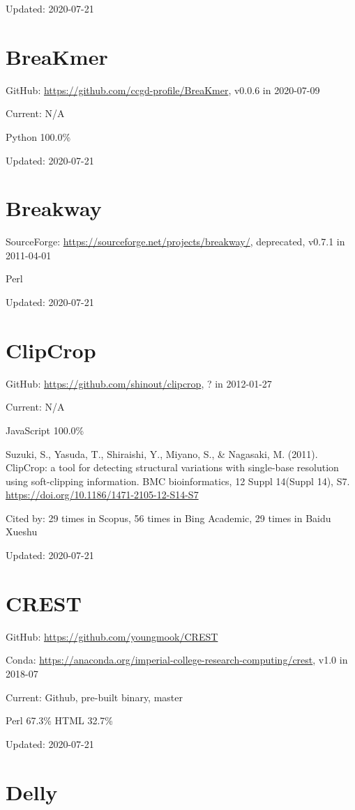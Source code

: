 \documentclass[]{article}
\newcommand{\cb}[3]{\par Cited by: {\color{blue}\Huge #1} times in Scopus, {\color{blue}\Huge #2} times in Bing Academic, {\color{blue}\Huge #3} times in Baidu Xueshu}
\begin{document}
Updated: 2020-07-21

\section{BreaKmer}

GitHub: \url{https://github.com/ccgd-profile/BreaKmer}, v0.0.6 in 2020-07-09

Current: N/A

Python 100.0\%

Updated: 2020-07-21

\section{Breakway}

SourceForge: \url{https://sourceforge.net/projects/breakway/}, deprecated, v0.7.1 in 2011-04-01

Perl

Updated: 2020-07-21

\section{ClipCrop}

GitHub: \url{https://github.com/shinout/clipcrop}, ? in 2012-01-27

Current: N/A

JavaScript 100.0\%

Suzuki, S., Yasuda, T., Shiraishi, Y., Miyano, S., \& Nagasaki, M. (2011). ClipCrop: a tool for detecting structural variations with single-base resolution using soft-clipping information. BMC bioinformatics, 12 Suppl 14(Suppl 14), S7. \url{https://doi.org/10.1186/1471-2105-12-S14-S7}\cb{29}{56}{29}

Updated: 2020-07-21

\section{CREST}

GitHub: \url{https://github.com/youngmook/CREST}

Conda: \url{https://anaconda.org/imperial-college-research-computing/crest}, v1.0 in 2018-07

Current: Github, pre-built binary, master

Perl 67.3\% HTML 32.7\%

Updated: 2020-07-21

\section{Delly}
\end{document}
